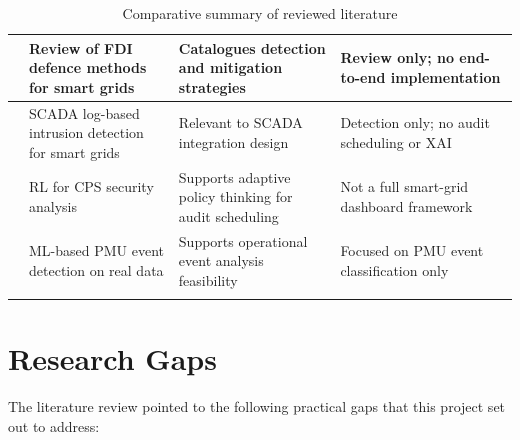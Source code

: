 \begin{longtable}{|p{0.6cm}|p{3.8cm}|p{4.0cm}|p{4.5cm}|}
\hline
\cite{bountakas2023defense} & Review of FDI defence methods for smart grids & Catalogues detection and mitigation strategies & Review only; no end-to-end implementation \\
\hline
\cite{martinelli2022method} & SCADA log-based intrusion detection for smart grids & Relevant to SCADA integration design & Detection only; no audit scheduling or XAI \\
\hline
\cite{ibrahim2023security} & RL for CPS security analysis & Supports adaptive policy thinking for audit scheduling & Not a full smart-grid dashboard framework \\
\hline
\cite{yin2024event} & ML-based PMU event detection on real data & Supports operational event analysis feasibility & Focused on PMU event classification only \\
\hline

\caption{Comparative summary of reviewed literature}
\label{tab:lit_survey}
\end{longtable}


\section{Research Gaps}

The literature review pointed to the following practical gaps that this project set out to address:

